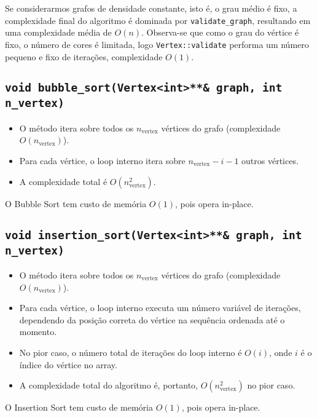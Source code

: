 \documentclass{article}
\begin{document}
 Se considerarmos grafos de densidade constante, isto é, o grau médio é fixo, a complexidade final do algoritmo é dominada por \texttt{validate\_graph}, resultando em uma complexidade média de \(O(n)\). Observa-se que como o grau do vértice é fixo, o número de cores é limitada, logo \texttt{Vertex::validate} performa um número pequeno e fixo de iterações, complexidade \(O(1)\).

\subsection{\texttt{void bubble\_sort(Vertex<int>**\& graph, int n\_vertex)}}
\begin{itemize}
    \item O método itera sobre todos os \(n_{\text{vertex}}\) vértices do grafo (complexidade \(O(n_{\text{vertex}})\)).
    \item Para cada vértice, o loop interno itera sobre \(n_{\text{vertex}}-i-1\) outros vértices.
    \item A complexidade total é \(O(n_{\text{vertex}}^2)\).
\end{itemize}

O Bubble Sort tem custo de memória \(O(1)\), pois opera in-place.


\subsection{\texttt{void insertion\_sort(Vertex<int>**\& graph, int n\_vertex)}}
\begin{itemize}
    \item O método itera sobre todos os \(n_{\text{vertex}}\) vértices do grafo (complexidade \(O(n_{\text{vertex}})\)).
    \item Para cada vértice, o loop interno executa um número variável de iterações, dependendo da posição correta do vértice na sequência ordenada até o momento.
    \item No pior caso, o número total de iterações do loop interno é \(O(i)\), onde \(i\) é o índice do vértice no array.
    \item A complexidade total do algoritmo é, portanto, \(O(n_{\text{vertex}}^2)\) no pior caso.
\end{itemize}

O Insertion Sort tem custo de memória \(O(1)\), pois opera in-place.

\end{document}
